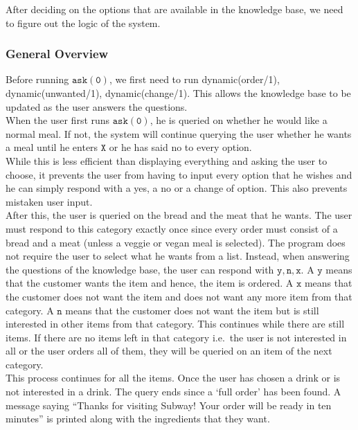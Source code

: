 \documentclass{article}
\begin{document}
\noindent After deciding on the options that are available in the knowledge base, we need to figure out the logic of the system.

\subsubsection*{General Overview}

Before running $\mathtt{ask(0)}$, we first need to run dynamic(order/1), dynamic(unwanted/1), dynamic(change/1). This allows the knowledge base to be updated as the user answers the questions. \\

\noindent When the user first runs $\mathtt{ask(0)}$, he is queried on whether he would like a normal meal. If not, the system will continue querying the user whether he wants a meal until he enters $\mathtt{X}$ or he has said no to every option. \\

\noindent While this is less efficient than displaying everything and asking the user to choose, it prevents the user from having to input every option that he wishes and he can simply respond with a yes, a no or a change of option. This also prevents mistaken user input. \\

\noindent After this, the user is queried on the bread and the meat that he wants. The user must respond to this category exactly once since every order must consist of a bread and a meat (unless a veggie or vegan meal is selected). The program does not require the user to select what he wants from a list. Instead, when answering the questions of the knowledge base, the user can respond with $\mathtt{y, n, x}$. A $\mathtt{y}$ means that the customer wants the item and hence, the item is ordered. A $\mathtt{x}$ means that the customer does not want the item and does not want any more item from that category. A $\mathtt{n}$ means that the customer does not want the item but is still interested in other items from that category. This continues while there are still items. If there are no items left in that category i.e.\  the user is not interested in all or the user orders all of them, they will be queried on an item of the next category.  \\

\noindent This process continues for all the items. Once the user has chosen a drink or is not interested in a drink. The query ends since a `full order' has been found. A message saying ``Thanks for visiting Subway! Your order will be ready in ten minutes'' is printed along with the ingredients that they want. \\
\end{document}
